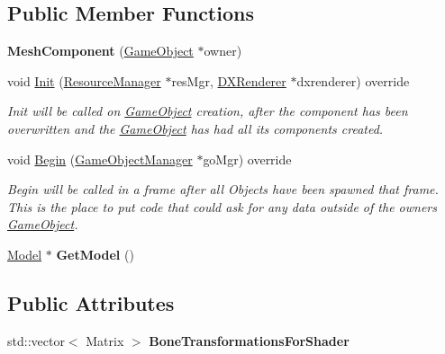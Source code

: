 \subsection*{Public Member Functions}
\begin{DoxyCompactItemize}
\item 
\mbox{\label{classMeshComponent_ab67426ad3bbc1396606668eb79af31e4}} 
{\bfseries Mesh\+Component} (\hyperlink{classGameObject}{Game\+Object} $\ast$owner)
\item 
void \hyperlink{classMeshComponent_ad99787b15690dd9ae239590dcdad6993}{Init} (\hyperlink{classResourceManager}{Resource\+Manager} $\ast$res\+Mgr, \hyperlink{classDXRenderer}{D\+X\+Renderer} $\ast$dxrenderer) override
\begin{DoxyCompactList}\small\item\em Init will be called on \hyperlink{classGameObject}{Game\+Object} creation, after the component has been overwritten and the \hyperlink{classGameObject}{Game\+Object} has had all its components created. \end{DoxyCompactList}\item 
void \hyperlink{classMeshComponent_a7ec68255fed493e34021fc15cec12581}{Begin} (\hyperlink{classGameObjectManager}{Game\+Object\+Manager} $\ast$go\+Mgr) override
\begin{DoxyCompactList}\small\item\em Begin will be called in a frame after all Objects have been spawned that frame. This is the place to put code that could ask for any data outside of the owner\textquotesingle{}s \hyperlink{classGameObject}{Game\+Object}. \end{DoxyCompactList}\item 
\mbox{\label{classMeshComponent_accf409e1a5f8b4b24312f5dcec217d54}} 
\hyperlink{classModel}{Model} $\ast$ {\bfseries Get\+Model} ()
\end{DoxyCompactItemize}
\subsection*{Public Attributes}
\begin{DoxyCompactItemize}
\item 
\mbox{\label{classMeshComponent_ae3fb9bc2df831c44b9c7eea23514bff1}} 
std\+::vector$<$ Matrix $>$ {\bfseries Bone\+Transformations\+For\+Shader}
\end{DoxyCompactItemize}

